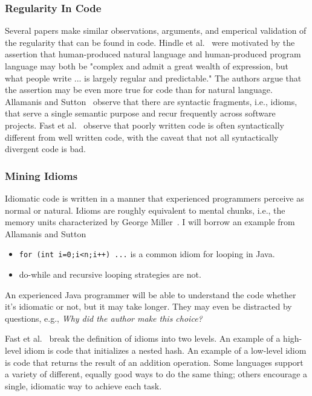 \subsubsection{Regularity In Code}

Several papers make similar observations, arguments, and emperical validation of the regularity that can be found in code. Hindle et al.~\cite{Hindle2012} were motivated by the assertion that human-produced natural language and human-produced program language may both be "complex and admit a great wealth of expression, but what people write ... is largely regular and predictable." The authors argue that the assertion may be even more true for code than for natural language. Allamanis and Sutton~\cite{allamanis2014mining} observe that there are syntactic fragments, i.e., idioms, that serve a single semantic purpose and recur frequently across software projects. Fast et al.~\cite{codex} observe that poorly written code is often syntactically different from well written code, with the caveat that not all syntactically divergent code is bad.

\subsubsection{Mining Idioms}

Idiomatic code is written in a manner that experienced programmers perceive as normal or natural. Idioms are roughly equivalent to mental chunks, i.e., the memory units characterized by George Miller~\cite{chunking}. I will borrow an example from Allamanis and Sutton~\cite{allamanis2014mining}

\begin{itemize}
\item \texttt{for (int i=0;i<n;i++) ...} is a common idiom for looping in Java.
\item do-while and recursive looping strategies are not.
\end{itemize}

An experienced Java programmer will be able to understand the code whether it's idiomatic or not, but it may take longer. They may even be distracted by questions, e.g., {\it Why did the author make this choice?}

Fast et al.~\cite{codex} break the definition of idioms into two levels. An example of a high-level idiom is code that initializes a nested hash. An example of a low-level idiom is code that returns the result of an addition operation. Some languages support a variety of different, equally good ways to do the same thing; others encourage a single, idiomatic way to achieve each task.

